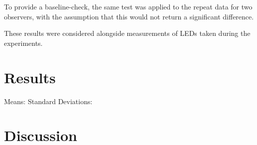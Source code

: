 To provide a baseline-check, the same test was applied to the repeat data for two observers, with the assumption that this would not return a significant difference.

These results were considered alongside measurements of LEDs taken during the experiments.

\section{Results}

Means:
Standard Deviations:




\section{Discussion}

